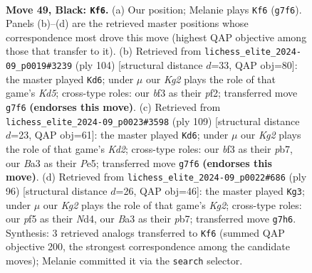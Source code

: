 \documentclass[11pt]{article}
\begin{document}
\clearpage

\begin{figure}[p]\centering
\begin{subfigure}{0.46\textwidth}\centering
\resizebox{\linewidth}{!}{%
\newchessgame
\chessboard[
  setfen={8/p5k1/8/1p3PR1/8/bq3BK1/8/8 b - - 1 49},
  showmover=false,
  pgfstyle=straightmove, color=movearrow, markmove={g7-f6}
]}
\caption{}
\end{subfigure}\hfill
\begin{subfigure}{0.46\textwidth}\centering
\resizebox{\linewidth}{!}{%
\newchessgame
\chessboard[
  setfen={8/6k1/7p/P2K1r2/8/8/5p2/5Q2 w - - 2 53},
  showmover=false,
  pgfstyle=straightmove, color=movearrow, markmove={d5-d6}
]}
\caption{}
\end{subfigure}
\\[4pt]
\begin{subfigure}{0.46\textwidth}\centering
\resizebox{\linewidth}{!}{%
\newchessgame
\chessboard[
  setfen={1q6/1P1k2R1/1K6/4p3/6P1/8/8/8 b - - 1 55},
  showmover=false,
  pgfstyle=straightmove, color=movearrow, markmove={d7-d6}
]}
\caption{}
\end{subfigure}\hfill
\begin{subfigure}{0.46\textwidth}\centering
\resizebox{\linewidth}{!}{%
\newchessgame
\chessboard[
  setfen={kn3Q2/1p6/7P/8/3N2P1/4P3/r5K1/8 w - - 3 49},
  showmover=false,
  pgfstyle=straightmove, color=movearrow, markmove={g2-g3}
]}
\caption{}
\end{subfigure}
\caption{\textbf{Move 49, Black: \texttt{Kf6}.} (a) Our position; Melanie plays \texttt{Kf6} (\texttt{g7f6}). Panels (b)--(d) are the retrieved master positions whose correspondence most drove this move (highest QAP objective among those that transfer to it). (b) Retrieved from \texttt{lichess\_elite\_2024-09\_p0019\#3239} (ply 104) [structural distance $d$=33, QAP obj=80]: the master played \texttt{Kd6}; under $\mu$ our \emph{Kg2} plays the role of that game's \emph{Kd5}; cross-type roles: our \emph{b}f3 as their \emph{p}f2; transferred move \texttt{g7f6} \textbf{(endorses this move)}. (c) Retrieved from \texttt{lichess\_elite\_2024-09\_p0023\#3598} (ply 109) [structural distance $d$=23, QAP obj=61]: the master played \texttt{Kd6}; under $\mu$ our \emph{Kg2} plays the role of that game's \emph{Kd2}; cross-type roles: our \emph{b}f3 as their \emph{p}b7, our \emph{B}a3 as their \emph{P}e5; transferred move \texttt{g7f6} \textbf{(endorses this move)}. (d) Retrieved from \texttt{lichess\_elite\_2024-09\_p0022\#686} (ply 96) [structural distance $d$=26, QAP obj=46]: the master played \texttt{Kg3}; under $\mu$ our \emph{Kg2} plays the role of that game's \emph{Kg2}; cross-type roles: our \emph{p}f5 as their \emph{N}d4, our \emph{B}a3 as their \emph{p}b7; transferred move \texttt{g7h6}. Synthesis: 3 retrieved analogs transferred to \texttt{Kf6} (summed QAP objective 200, the strongest correspondence among the candidate moves); Melanie committed it via the \texttt{search} selector.}
\label{fig:thought-m97}
\end{figure}
\end{document}
